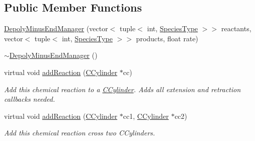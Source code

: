 \subsection*{Public Member Functions}
\begin{DoxyCompactItemize}
\item 
\hyperlink{classDepolyMinusEndManager_a73320a4e7bcb4512db8b31ca594a6a03}{Depoly\+Minus\+End\+Manager} (vector$<$ tuple$<$ int, \hyperlink{Species_8h_a50651af47c56ea0e27235468d23542cf}{Species\+Type} $>$$>$ reactants, vector$<$ tuple$<$ int, \hyperlink{Species_8h_a50651af47c56ea0e27235468d23542cf}{Species\+Type} $>$$>$ products, float rate)
\item 
\hyperlink{classDepolyMinusEndManager_a5835c7a87de23b29f47b36038fb3590b}{$\sim$\+Depoly\+Minus\+End\+Manager} ()
\item 
virtual void \hyperlink{classDepolyMinusEndManager_a6b79b7cd146bff0803044e063a9c6ef9}{add\+Reaction} (\hyperlink{classCCylinder}{C\+Cylinder} $\ast$cc)
\begin{DoxyCompactList}\small\item\em Add this chemical reaction to a \hyperlink{classCCylinder}{C\+Cylinder}. Adds all extension and retraction callbacks needed. \end{DoxyCompactList}\item 
virtual void \hyperlink{classDepolyMinusEndManager_a9ad21dd3ddb33af4e371dbdaae2d1295}{add\+Reaction} (\hyperlink{classCCylinder}{C\+Cylinder} $\ast$cc1, \hyperlink{classCCylinder}{C\+Cylinder} $\ast$cc2)
\begin{DoxyCompactList}\small\item\em Add this chemical reaction cross two C\+Cylinders. \end{DoxyCompactList}\end{DoxyCompactItemize}
